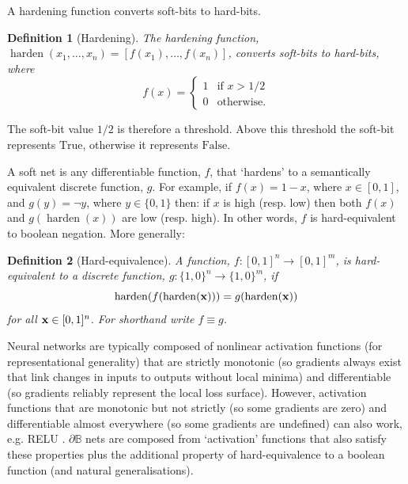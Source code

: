 \documentclass{article} %
\newtheorem*{definition}{Definition}
\begin{document}
A hardening function converts soft-bits to hard-bits.

\begin{definition}[Hardening]
The {\em hardening} function, $\operatorname{harden}(x_{1}, \dots, x_{n}) = [f(x_{1}), \dots, f(x_{n})]$, converts soft-bits to hard-bits, where
\begin{equation*}
f(x) =
\begin{cases}
1 & \text{if } x > 1/2 \\
0 & \text{otherwise.}
\end{cases}
\end{equation*}
\end{definition}

The soft-bit value $1/2$ is therefore a threshold. Above this threshold the soft-bit represents $\text{True}$, otherwise it represents $\text{False}$.

A soft net is any differentiable function, $f$, that `hardens' to a semantically equivalent discrete function, $g$. For example, if $f(x) = 1 - x$, where $x \in [0,1]$, and $g(y) = \neg y$, where $y \in \{0,1\}$ then: if $x$ is high (resp. low) then both $f(x)$ and $g(\operatorname{harden}(x))$ are low (resp. high). In other words, $f$ is hard-equivalent to boolean negation. More generally:

\begin{definition}[Hard-equivalence]
	A function, $f: [0,1]^n \rightarrow [0,1]^m$, is {\em hard-equivalent} to a discrete function, $g: \{1,0\}^n \rightarrow \{1,0\}^m$,	if
	\begin{equation*}
	\operatorname{harden}(f(\operatorname{harden}({\bf x}))) = g(\operatorname{harden}({\bf x}))
	\end{equation*}
for all ${\bf x} \in [0,1]^{n}$. For shorthand write $f \equiv g$.
\end{definition}

Neural networks are typically composed of nonlinear activation functions (for representational generality) that are strictly monotonic (so gradients always exist that link changes in inputs to outputs without local minima) and differentiable (so gradients reliably represent the local loss surface). However, activation functions that are monotonic but not strictly (so some gradients are zero) and differentiable almost everywhere (so some gradients are undefined) can also work, e.g. RELU \citep{10.5555/3104322.3104425}. $\partial \mathbb{B}$ nets are composed from `activation' functions that also satisfy these properties plus the additional property of hard-equivalence to a boolean function (and natural generalisations).
\end{document}
